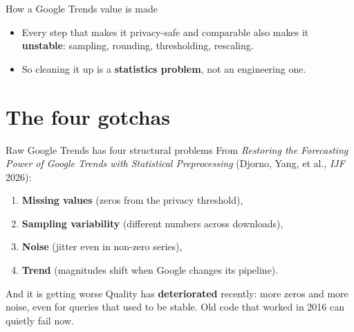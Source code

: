 \documentclass[aspectratio=169,11pt]{beamer}
\begin{document}
\begin{frame}{How a Google Trends value is made}
  \begin{center}
  \end{center}
  \vspace{0.5em}
  \begin{itemize}
    \item Every step that makes it privacy-safe and comparable also makes it
          \textbf{unstable}: sampling, rounding, thresholding, rescaling.
    \item So cleaning it up is a \textbf{statistics problem}, not an engineering one.
  \end{itemize}
\end{frame}

\section{The four gotchas}

\begin{frame}{Raw Google Trends has four structural problems}
  From \emph{Restoring the Forecasting Power of Google Trends with Statistical
  Preprocessing} (Djorno, Yang, et al., \emph{IJF} 2026):
  \begin{enumerate}
    \item \textbf{Missing values} (zeros from the privacy threshold),
    \item \textbf{Sampling variability} (different numbers across downloads),
    \item \textbf{Noise} (jitter even in non-zero series),
    \item \textbf{Trend} (magnitudes shift when Google changes its pipeline).
  \end{enumerate}
  \vspace{0.4em}
  \begin{alertblock}{And it is getting worse}
    Quality has \textbf{deteriorated} recently: more zeros and more noise, even for
    queries that used to be stable. Old code that worked in 2016 can quietly fail now.
  \end{alertblock}
\end{frame}
\end{document}
